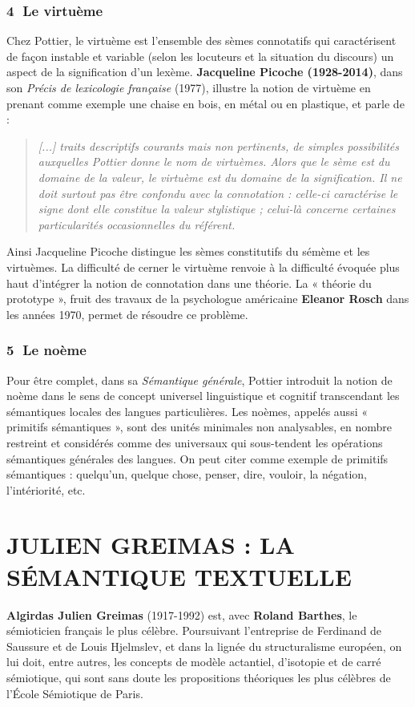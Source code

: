 \subsubsection*{\textcircled{\scriptsize 4} Le virtuème}
Chez Pottier, le virtuème est l’ensemble des sèmes connotatifs qui caractérisent de façon instable et variable (selon les locuteurs et la situation du discours) un aspect de la signification d’un lexème. \textbf{Jacqueline Picoche (1928-2014)}, dans son \textit{Précis de lexicologie française} (1977), illustre la notion de virtuème en prenant comme exemple une chaise en bois, en métal ou en plastique, et parle de :
\begin{quote}\small\itshape
[...] traits descriptifs courants mais non pertinents, de simples possibilités auxquelles Pottier donne le nom de virtuèmes. Alors que le sème est du domaine de la valeur, le virtuème est du domaine de la signification. Il ne doit surtout pas être confondu avec la connotation : celle-ci caractérise le signe dont elle constitue la valeur stylistique ; celui-là concerne certaines particularités occasionnelles du référent.
\end{quote}
Ainsi Jacqueline Picoche distingue les sèmes constitutifs du sémème et les virtuèmes. La difficulté de cerner le virtuème renvoie à la difficulté évoquée plus haut d’intégrer la notion de connotation dans une théorie. La « théorie du prototype », fruit des travaux de la psychologue américaine \textbf{Eleanor Rosch} dans les années 1970, permet de résoudre ce problème.

\subsubsection*{\textcircled{\scriptsize 5} Le noème}
Pour être complet, dans sa \textit{Sémantique générale}, Pottier introduit la notion de noème dans le sens de concept universel linguistique et cognitif transcendant les sémantiques locales des langues particulières. Les noèmes, appelés aussi « primitifs sémantiques », sont des unités minimales non analysables, en nombre restreint et considérés comme des universaux qui sous-tendent les opérations sémantiques générales des langues. On peut citer comme exemple de primitifs sémantiques : quelqu’un, quelque chose, penser, dire, vouloir, la négation, l’intériorité, etc.

\section{JULIEN GREIMAS : LA SÉMANTIQUE TEXTUELLE}
\textbf{Algirdas Julien Greimas} (1917-1992) est, avec \textbf{Roland Barthes}, le sémioticien français le plus célèbre. Poursuivant l’entreprise de Ferdinand de Saussure et de Louis Hjelmslev, et dans la lignée du structuralisme européen, on lui doit, entre autres, les concepts de modèle actantiel, d’isotopie et de carré sémiotique, qui sont sans doute les propositions théoriques les plus célèbres de l’École Sémiotique de Paris.

